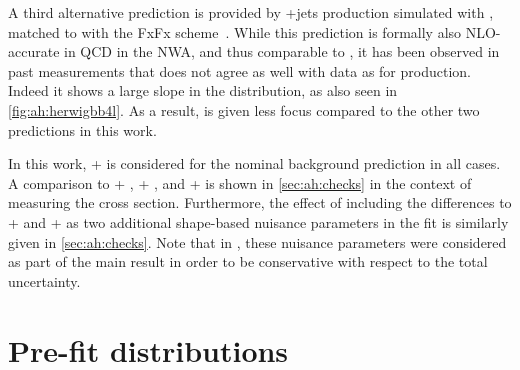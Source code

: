 A third alternative prediction is provided by \ttbar+jets production simulated with \amcatnlo, matched to \pythia with the FxFx scheme~\cite{Frederix:2012ps}. While this prediction is formally also NLO-accurate in QCD in the NWA, and thus comparable to \powheg \hvq, it has been observed in past measurements that \amcatnlo does not agree as well with data as \powheg for \ttbar production. Indeed it shows a large slope in the \mtt distribution, as also seen in \cref{fig:ah:herwigbb4l}. As a result, \amcatnlo is given less focus compared to the other two predictions in this work.

In this work, \powheg \hvq + \pythia is considered for the nominal background prediction in all cases. A comparison to \powheg \hvq + \herwig, \amcatnlo + \pythia, and \bbfourl + \pythia is shown in \cref{sec:ah:checks} in the context of measuring the \etat cross section. Furthermore, the effect of including the differences to \powheg \hvq + \herwig and \bbfourl + \pythia as two additional shape-based nuisance parameters in the fit is similarly given in \cref{sec:ah:checks}. Note that in , these nuisance parameters were considered as part of the main result in order to be conservative with respect to the total uncertainty.

\section{Pre-fit distributions}
\label{sec:ah:prefit}

